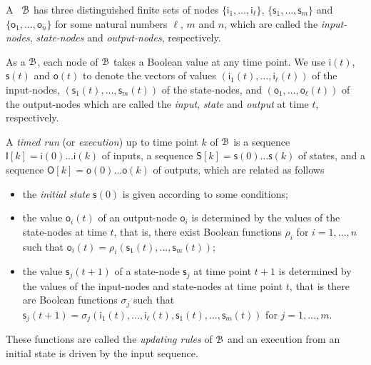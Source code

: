 A \BCN\  ${\mathcal{B}}$ has three distinguished finite sets of nodes $\{\mathsf{i}_1,\ldots, \mathsf{i}_\ell\}$, $\{\mathsf{s}_1,\ldots,\mathsf{s}_m\}$ and $\{\mathsf{o}_1,\ldots, \mathsf{o}_n\}$ for some natural numbers $\ell$, $m$ and $n$, which are called the {\em input-nodes}, {\em state-nodes}  and {\em output-nodes}, respectively. 

As a {\BCN} ${\mathcal{B}}$, each node of   ${\mathcal{B}}$   takes a Boolean value at any time point. We use $\mathsf{i}(t)$, $\mathsf{s}(t)$ and $\mathsf{o}(t)$  to denote the vectors of values $(\mathsf{i}_1(t),\ldots,\mathsf{i}_\ell(t))$ of the input-nodes,  $(\mathsf{s}_1(t),\ldots,\mathsf{s}_m(t))$ of the state-nodes, and $(\mathsf{o}_1,\ldots,\mathsf{o}_\ell(t))$ of the output-nodes  which are called the {\em input}, {\em state} and {\em output} at time $t$, respectively.

A {\em timed run}  (or {\em execution}) up to time point $k$ of  ${\mathcal{B}}$ is a sequence $\mathsf{I}[k] = \mathsf{i}(0)\ldots \mathsf{i}(k)$ of inputs, a sequence $\mathsf{S}[k] = \mathsf{s}(0)\ldots \mathsf{s}(k)$ of states, and a sequence $\mathsf{O}[k] = \mathsf{o}(0)\ldots \mathsf{o}(k)$  of outputs, which are related as follows

\begin{itemize}
\item the {\em initial state} $\mathsf{s}(0)$ is given according to some conditions;
	\item the value $\mathsf{o}_i(t)$ of an output-node $\mathsf{o}_i$  is determined by the values of the state-nodes at time $t$, that is, there exist Boolean functions $\rho_i$ for $i=1,\ldots,n$ such that $\mathsf{o}_i(t)=\rho_i(\mathsf{s}_1(t),\ldots,\mathsf{s}_m(t))$; 
	\item the value $\mathsf{s}_j(t+1)$ of a state-node $\mathsf{s}_j$ at time point $t+1$ is determined by the values of the input-nodes and state-nodes at time point $t$, that is there are Boolean functions $\sigma_j$ such that $\mathsf{s}_j(t+1)=\sigma_j(\mathsf{i}_1(t),\ldots,\mathsf{i}_\ell(t),\mathsf{s}_1(t),\ldots,\mathsf{s}_m(t))$ for $j=1,\ldots,m$.
\end{itemize}
 These functions are called the {\em updating rules} of ${\mathcal{B}}$ and an execution from an initial state is driven by the input sequence.
 
